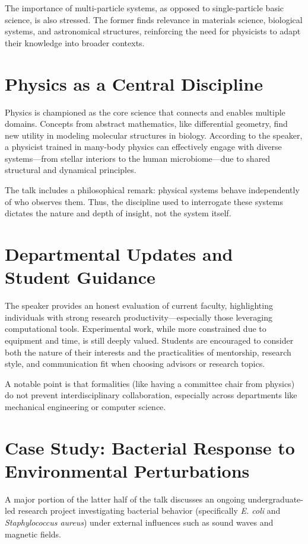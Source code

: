 \documentclass[12pt]{article}
\begin{document}
The importance of multi-particle systems, as opposed to single-particle basic science, is also stressed. The former finds relevance in materials science, biological systems, and astronomical structures, reinforcing the need for physicists to adapt their knowledge into broader contexts.

\section*{Physics as a Central Discipline}
Physics is championed as the core science that connects and enables multiple domains. Concepts from abstract mathematics, like differential geometry, find new utility in modeling molecular structures in biology. According to the speaker, a physicist trained in many-body physics can effectively engage with diverse systems---from stellar interiors to the human microbiome---due to shared structural and dynamical principles.

The talk includes a philosophical remark: physical systems behave independently of who observes them. Thus, the discipline used to interrogate these systems dictates the nature and depth of insight, not the system itself.

\section*{Departmental Updates and Student Guidance}
The speaker provides an honest evaluation of current faculty, highlighting individuals with strong research productivity---especially those leveraging computational tools. Experimental work, while more constrained due to equipment and time, is still deeply valued. Students are encouraged to consider both the nature of their interests and the practicalities of mentorship, research style, and communication fit when choosing advisors or research topics.

A notable point is that formalities (like having a committee chair from physics) do not prevent interdisciplinary collaboration, especially across departments like mechanical engineering or computer science.

\section*{Case Study: Bacterial Response to Environmental Perturbations}
A major portion of the latter half of the talk discusses an ongoing undergraduate-led research project investigating bacterial behavior (specifically \textit{E. coli} and \textit{Staphylococcus aureus}) under external influences such as sound waves and magnetic fields.
\end{document}
